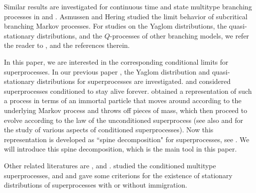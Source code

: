 \documentclass[12pt,a4paper]{amsart}
\numberwithin{equation}{section}
\theoremstyle{plain}
\theoremstyle{definition}
\theoremstyle{remark}
\begin{document}
  Similar results are investigated for continuous time and state multitype branching processes in \cite{Penisson2010Conditional} and \cite{Penisson2011Conditional}.  Asmussen and Hering \cite{AH} studied the limit behavior of subcritical branching Markov processes.
	For studies on  the Yaglom distributions,  the quasi-stationary distributions, and the $Q$-processes of other branching models, we refer the reader to \cite{SP}, \cite{SM} and the references therein.

In this paper, we are interested in the corresponding conditional limits for superprocesses. In our  previous paper \cite{LiuRenSongSun2020}, the Yaglom distribution and  quasi-stationary distributions for superprocesses are investigated.  \cite[Proposition $1$]{RoellyRouault1989Processus} and \cite{Evans1993Two} considered  superprocesses conditioned to  stay alive forever.  \cite{Evans1993Two} obtained a representation of such a process in terms of an immortal particle that moves around according to the underlying Markov process and throws off pieces of mass, which then proceed to evolve according to the law of the unconditioned superprocess
(see also \cite{EW} and \cite{EP} for the study of various aspects of conditioned superprocesses). Now this representation is developed as ``spine decomposition" for superprocesses, see .  
We will introduce this spine decomposition, which is the main tool in this paper.

Other related literatures are   \cite{ChampagnatRoelly2008Limit}, \cite{Li20} and \cite{Sta}. \cite{ChampagnatRoelly2008Limit} studied the conditioned multitype  superprocesses, and  \cite{Li20} and \cite{Sta} gave some criterions for the existence of stationary distributions of superprocesses with or without immigration.
\end{document}
